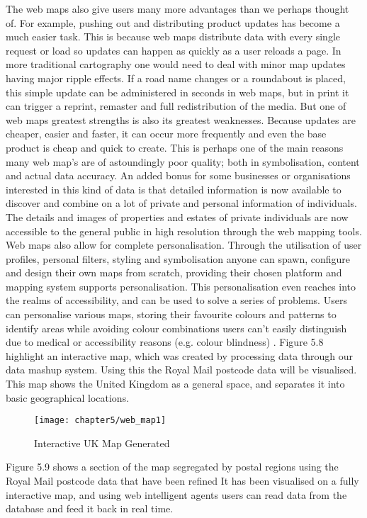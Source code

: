 The web maps also give users many more advantages than we perhaps thought of. For example, pushing out and distributing product updates has become a much easier task. This is because web maps distribute data with every single request or load so updates can happen as quickly as a user reloads a page. In more traditional cartography one would need to deal with minor map updates having major ripple effects. If a road name changes or a roundabout is placed, this simple update can be administered in seconds in web maps, but in print it can trigger a reprint, remaster and full redistribution of the media. But one of web maps greatest strengths is also its greatest weaknesses. Because updates are cheaper, easier and faster, it can occur more frequently and even the base product is cheap and quick to create. This is perhaps one of the main reasons many web map's are of astoundingly poor quality; both in symbolisation, content and actual data accuracy. An added bonus for some businesses or organisations interested in this kind of data is that detailed information is now available to discover and combine on a lot of private and personal information of individuals. The details and images of properties and estates of private individuals are now accessible to the general public in high resolution through the web mapping tools. Web maps also allow for complete personalisation. Through the utilisation of user profiles, personal filters, styling and symbolisation anyone can spawn, configure and design their own maps from scratch, providing their chosen platform and mapping system supports personalisation. This personalisation even reaches into the realms of accessibility, and can be used to solve a series of problems. Users can personalise various maps, storing their favourite colours and patterns to identify areas while avoiding colour combinations users can't easily distinguish due to medical or accessibility reasons (e.g. colour blindness) \cite{ware2013information}. Figure 5.8 highlight an interactive map, which was created by processing data through our data mashup system. Using this the Royal Mail postcode data will be visualised. This map shows the United Kingdom as a general space, and separates it into basic geographical locations. 
 
\begin{figure}
\centering
\texttt{[image: chapter5/web\_map1]}
\caption{Interactive UK Map Generated}
\end{figure}

Figure 5.9 shows a section of the map segregated by postal regions using the Royal Mail postcode data that have been refined It has been visualised on a fully interactive map, and using web intelligent agents users can read data from the database and feed it back in real time.

